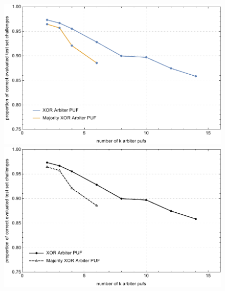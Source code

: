 
\begin{figure}[ht]
\ifx{}\undefined
{}
\else
	\if{}
	\centering
	\includegraphics[width=1.00\textwidth]{images/xor-cma-attack-performance.pdf}
	\else
	\includegraphics[width=1.00\textwidth]{images/xor-cma-attack-performance_mono.pdf}

\end{figure}
